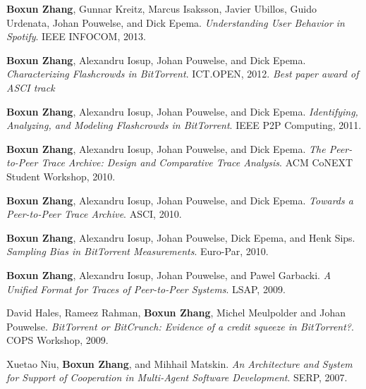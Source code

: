 \documentclass[margin,line]{resume}
\begin{document}
\begin{resume}
\vspace{-2mm}
\textbf{Boxun Zhang}, Gunnar Kreitz, Marcus Isaksson, Javier Ubillos, Guido
Urdenata, Johan Pouwelse, and Dick Epema. \emph{Understanding User Behavior
in Spotify}. IEEE INFOCOM, 2013.

\vspace{-2mm}
\textbf{Boxun Zhang}, Alexandru Iosup, Johan Pouwelse, and Dick Epema.
\emph{Characterizing Flashcrowds in BitTorrent}. ICT.OPEN, 2012.
\emph{Best paper award of ASCI track}

\vspace{-2mm}
\textbf{Boxun Zhang}, Alexandru Iosup, Johan Pouwelse, and Dick Epema.
\emph{Identifying, Analyzing, and Modeling Flashcrowds in BitTorrent}. IEEE P2P Computing,
2011.

\vspace{-2mm}
\textbf{Boxun Zhang}, Alexandru Iosup, Johan Pouwelse, and Dick Epema. \emph{The
Peer-to-Peer Trace Archive: Design and Comparative Trace Analysis}. ACM CoNEXT
Student Workshop, 2010.

\vspace{-2mm}
\textbf{Boxun Zhang}, Alexandru Iosup, Johan Pouwelse, and Dick Epema.
\emph{Towards a Peer-to-Peer Trace Archive}. ASCI, 2010.

\vspace{-2mm}
\textbf{Boxun Zhang}, Alexandru Iosup, Johan Pouwelse, Dick Epema, and Henk
Sips. \emph{Sampling Bias in BitTorrent Measurements}. Euro-Par, 2010.

\vspace{-2mm}
\textbf{Boxun Zhang}, Alexandru Iosup, Johan Pouwelse, and Pawel Garbacki.
\textit{A Unified Format for Traces of Peer-to-Peer Systems}. LSAP, 2009.

\vspace{-2mm}
David Hales, Rameez Rahman, \textbf{Boxun Zhang}, Michel Meulpolder and Johan
Pouwelse. \textit{BitTorrent or BitCrunch: Evidence of a credit squeeze in
BitTorrent?}. COPS Workshop, 2009.

\vspace{-2mm}
Xuetao Niu, \textbf{Boxun Zhang}, and Mihhail Matskin. \textit{An Architecture
and System for Support of Cooperation in Multi-Agent Software Development}. SERP,
2007.




\end{resume}
\end{document}
